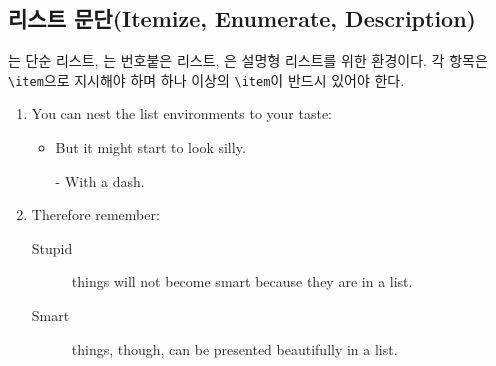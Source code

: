 \subsection{리스트 문단(Itemize, Enumerate, Description)}

는 단순 리스트,
는 번호붙은 리스트,
은 설명형 리스트를 위한 환경이다.
각 항목은 \verb|\item|으로 지시해야 하며 하나 이상의 \verb|\item|이 반드시 있어야 한다.

\begin{example}
\flushleft
\begin{enumerate}
  \item You can nest the list
environments to your taste:
  \begin{itemize}
    \item But it might start to
look silly.
    \item[-] With a dash.
  \end{itemize}
  \item Therefore remember:
  \begin{description}
    \item[Stupid] things will not
become smart because they are
in a list.
    \item[Smart] things, though,
can be presented beautifully
in a list.
  \end{description}
\end{enumerate}
\end{example}

